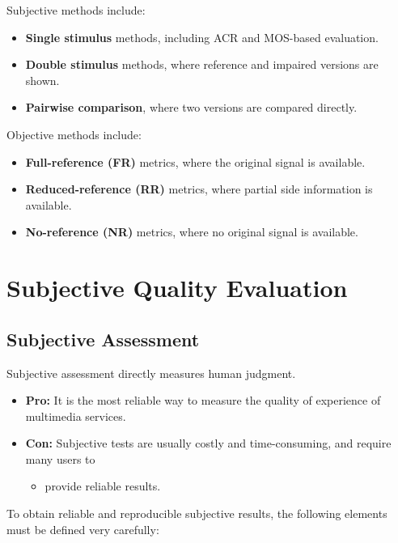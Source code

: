Subjective methods include:

\begin{itemize}
\item \textbf{Single stimulus} methods, including ACR and MOS-based evaluation.
\item \textbf{Double stimulus} methods, where reference and impaired versions are shown.
\item \textbf{Pairwise comparison}, where two versions are compared directly.
\end{itemize}

Objective methods include:

\begin{itemize}
\item \textbf{Full-reference (FR)} metrics, where the original signal is available.
\item \textbf{Reduced-reference (RR)} metrics, where partial side information is available.
\item \textbf{No-reference (NR)} metrics, where no original signal is available.
\end{itemize}

\section{Subjective Quality Evaluation}

\subsection{Subjective Assessment}

Subjective assessment directly measures human judgment.

\begin{itemize}
\item \textbf{Pro:} It is the most reliable way to measure the quality of experience of multimedia services.
\item \textbf{Con:} Subjective tests are usually costly and time-consuming, and require many users to
\begin{itemize}
\item provide reliable results.
\end{itemize}
\end{itemize}

To obtain reliable and reproducible subjective results, the following elements must be defined very carefully:

